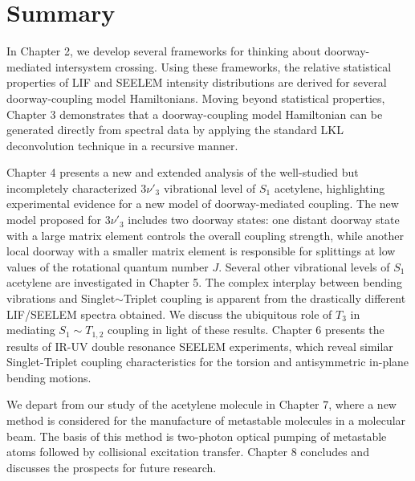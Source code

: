 \documentclass[12pt]{mitthesis}
\begin{document}
\section{Summary}

In Chapter 2, we develop several frameworks for thinking about
doorway-mediated intersystem crossing.  Using these frameworks, the
relative statistical properties of LIF and SEELEM intensity
distributions are derived for several doorway-coupling model
Hamiltonians.  Moving beyond statistical properties, Chapter 3
demonstrates that a doorway-coupling model Hamiltonian can be
generated directly from spectral data by applying the standard LKL
deconvolution technique in a recursive manner.

Chapter 4 presents a new and extended analysis of the well-studied but
incompletely characterized $3\nu'_3$ vibrational level of $S_1$
acetylene, highlighting experimental evidence for a new model of
doorway-mediated coupling.  The new model proposed for $3\nu'_3$
includes two doorway states: one distant doorway state with a large
matrix element controls the overall coupling strength, while another
local doorway with a smaller matrix element is responsible for
splittings at low values of the rotational quantum number $J$.
Several other vibrational levels of $S_1$ acetylene are investigated
in Chapter 5.  The complex interplay between bending vibrations and
Singlet$\sim$Triplet coupling is apparent from the drastically
different LIF/SEELEM spectra obtained.  We discuss the ubiquitous role
of $T_3$ in mediating $S_1 \sim T_{1,2}$ coupling in light of these
results.  Chapter 6 presents the results of IR-UV double resonance
SEELEM experiments, which reveal similar Singlet-Triplet coupling
characteristics for the torsion and antisymmetric in-plane bending
motions.

We depart from our study of the acetylene molecule in Chapter 7, where
a new method is considered for the manufacture of metastable molecules
in a molecular beam.  The basis of this method is two-photon optical
pumping of metastable atoms followed by collisional excitation
transfer.  Chapter 8 concludes and discusses the prospects for future
research.



\end{document}
